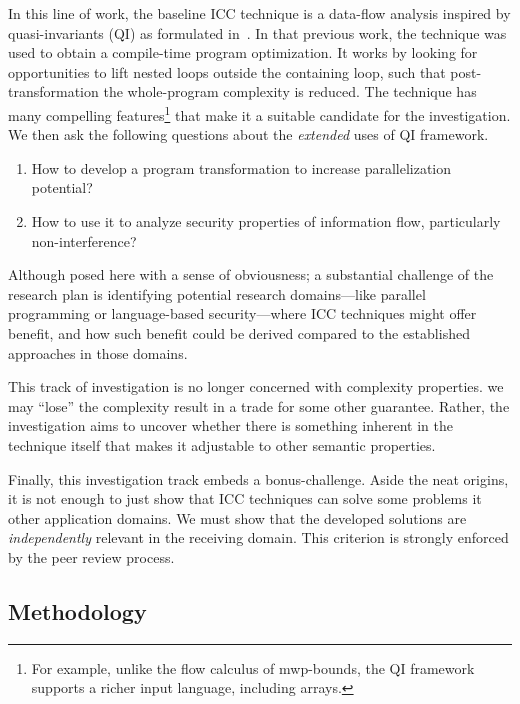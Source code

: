 In this line of work, the baseline ICC technique is a data-flow analysis inspired by quasi-invariants (QI) as formulated in~\textcite{moyen20172}.
In that previous work, the technique was used to obtain a compile-time program optimization.
It works by looking for opportunities to lift nested loops outside the containing loop, such that post-transformation the whole-program complexity is reduced.
The technique has many compelling features\footnote{For example, unlike the flow calculus of mwp-bounds, the QI framework supports a richer input language, including arrays.} that make it a suitable candidate for the investigation.
We then ask the following questions about the \emph{extended} uses of QI framework.
\begin{enumerate}
\item How to develop a program transformation to increase parallelization potential?
\item How to use it to analyze security properties of information flow, particularly non-interference?
\end{enumerate}
Although posed here with a sense of obviousness;
a substantial challenge of the research plan is {identifying} potential research domains---like parallel programming or language-based security---where ICC techniques might offer benefit, and how such benefit could be derived compared to the established approaches in those domains.

This track of investigation is no longer concerned with complexity properties.
\Ie we may \enquote{lose} the complexity result in a trade for some other guarantee.
Rather, the investigation aims to uncover whether there is something inherent in the {technique} itself that makes it adjustable to other semantic properties.

Finally, this investigation track embeds a bonus-challenge.
Aside the neat origins, it is not enough to just show that ICC techniques can solve some problems it other application domains.
We must show that the developed solutions are \emph{independently} relevant in the receiving domain.
This criterion is strongly enforced by the peer review process.

\subsection{Methodology}\label{methods}

